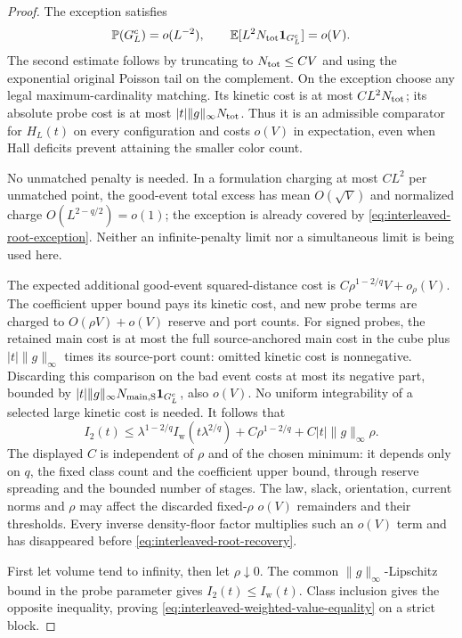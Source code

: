 \documentclass[11pt,reqno]{amsart}
\theoremstyle{definition}
\theoremstyle{remark}
\numberwithin{equation}{section}
\newcommand{\E}{\mathbb E}
\newcommand{\Pp}{\mathbb P}
\begin{document}
\begin{proof}
The exception satisfies
\begin{equation}
 \Pp(G_L^c)=o(L^{-2}),\qquad
 \E[L^2N_{\rm tot}\mathbf1_{G_L^c}]=o(V).
 \label{eq:interleaved-root-exception}
\end{equation}
The second estimate follows by truncating to \(N_{\rm tot}\le CV\)
and using the exponential original Poisson tail on the complement.
On the exception choose any legal maximum-cardinality matching.
Its kinetic cost is at most \(CL^2N_{\rm tot}\); its absolute probe
cost is at most \(|t|\|g\|_\infty N_{\rm tot}\). Thus it is an
admissible comparator for \(H_L(t)\) on every configuration and
costs \(o(V)\) in expectation, even when Hall deficits prevent
attaining the smaller color count.

No unmatched penalty is needed. In a formulation charging at most
\(CL^2\) per unmatched point, the good-event total excess has mean
\(O(\sqrt V)\) and normalized charge \(O(L^{2-q/2})=o(1)\);
the exception is already covered by
\eqref{eq:interleaved-root-exception}. Neither an infinite-penalty
limit nor a simultaneous limit is being used here.

The expected additional good-event squared-distance cost is
\(C\rho^{1-2/q}V+o_\rho(V)\). The coefficient upper bound pays
its kinetic cost, and new probe terms are charged to
\(O(\rho V)+o(V)\) reserve and port counts.
For signed probes, the retained main cost is at most the full
source-anchored main cost in the cube plus
\(|t|\|g\|_\infty\) times its source-port count: omitted kinetic
cost is nonnegative. Discarding this comparison on the bad event
costs at most its negative part, bounded by
\(|t|\|g\|_\infty N_{\rm main,S}\mathbf1_{G_L^c}\), also \(o(V)\).
No uniform integrability of a selected large kinetic cost is needed.
It follows that
\begin{equation}
 I_2(t)\le
 \lambda^{1-2/q}I_{\mathrm w}(t\lambda^{2/q})
       +C\rho^{1-2/q}+C|t|\|g\|_\infty\rho.
 \label{eq:interleaved-root-recovery}
\end{equation}
The displayed \(C\) is independent of \(\rho\) and of the chosen
minimum: it depends only on \(q\), the fixed class count and the
coefficient upper bound, through reserve spreading and the bounded
number of stages. The law, slack, orientation, current norms and
\(\rho\) may affect the discarded fixed-\(\rho\) \(o(V)\)
remainders and their thresholds. Every inverse density-floor factor
multiplies such an \(o(V)\) term and has disappeared before
\eqref{eq:interleaved-root-recovery}.

First let volume tend to infinity, then let \(\rho\downarrow0\).
The common \(\|g\|_\infty\)-Lipschitz bound in the probe parameter
gives \(I_2(t)\le I_{\mathrm w}(t)\). Class inclusion gives the
opposite inequality, proving
\eqref{eq:interleaved-weighted-value-equality} on a strict block.


\end{proof}
\end{document}
